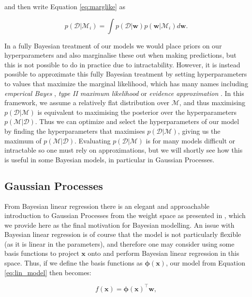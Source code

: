 \noindent and then write Equation \ref{eq:marglike} as 

\begin{equation}
    p(\mathcal{D}|\mathcal{M}_i) = \int p(\mathcal{D}|\mathbf{w})p(\mathbf{w}|\mathcal{M}_i)d\mathbf{w}.
\end{equation}

\noindent In a fully Bayesian treatment of our models we would place priors on our hyperparameters and also marginalise these out when making predictions, but this is not possible to do in practice due to intractability. However, it is instead possible to approximate this fully Bayesian treatment by setting hyperparameters to values that maximize the marginal likelihood, which has many names including \textit{emperical Bayes} \citep{bernardo2009bayesian}, \textit{type II maximum likelihood} \citep{berger1985statistical} or \textit{evidence approximation} \citep{MacKay1996}. In this framework, we assume a relatively flat distribution over $\mathcal{M}$, and thus maximising $p(\mathcal{D}|\mathcal{M})$ is equivalent to maximising the posterior over the hyperparameters $p(\mathcal{M}|\mathcal{D})$. Thus we can optimize and select the hyperparameters of our model by finding the hyperparameters that maximises $p(\mathcal{D}|\mathcal{M})$, giving us the maximum of $p(\mathcal{M}|\mathcal{D})$. Evaluating $p(\mathcal{D}|\mathcal{M})$ is for many models difficult or intractable so one must rely on approximations, but we will shortly see how this is useful in some Bayesian models, in particular in Gaussian Processes.

\subsection{Gaussian Processes}
\label{sec:GPs}
From Bayesian linear regression there is an elegant and approachable introduction to Gaussian Processes from the weight space as presented in \cite{Rasmussen2006Gaussian}, which we provide here as the final motivation for Bayesian modelling. An issue with Bayesian linear regression is of course that the model is not particularly flexible (as it is linear in the parameters), and therefore one may consider using some basis functions to project $\mathbf{x}$ onto and perform Bayesian linear regression in this space. Thus, if we define the basis functions as $\bm\phi(\mathbf{x})$, our model from Equation \ref{eq:lin_model} then becomes:

 \begin{equation}
     f(\mathbf{x}) = \bm\phi(\mathbf{x})^\top\mathbf{w},
 \end{equation}

